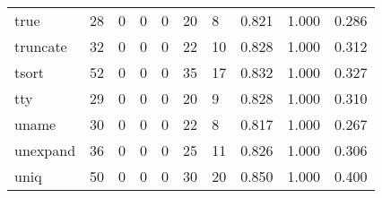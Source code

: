\begin{longtable}{lp{2.0cm}p{2.0cm}p{2.0cm}p{2.0cm}p{2.0cm}p{2.0cm}p{2.0cm}p{2.0cm}p{2.0cm}}
true      &                     28 &                                             0 &                                            0 &                                           0 &                                           20 &                                          8 &                                0.821 &                                  1.000 &                                0.286 \\
truncate  &                     32 &                                             0 &                                            0 &                                           0 &                                           22 &                                         10 &                                0.828 &                                  1.000 &                                0.312 \\
tsort     &                     52 &                                             0 &                                            0 &                                           0 &                                           35 &                                         17 &                                0.832 &                                  1.000 &                                0.327 \\
tty       &                     29 &                                             0 &                                            0 &                                           0 &                                           20 &                                          9 &                                0.828 &                                  1.000 &                                0.310 \\
uname     &                     30 &                                             0 &                                            0 &                                           0 &                                           22 &                                          8 &                                0.817 &                                  1.000 &                                0.267 \\
unexpand  &                     36 &                                             0 &                                            0 &                                           0 &                                           25 &                                         11 &                                0.826 &                                  1.000 &                                0.306 \\
uniq      &                     50 &                                             0 &                                            0 &                                           0 &                                           30 &                                         20 &                                0.850 &                                  1.000 &                                0.400 \\

\end{longtable}
